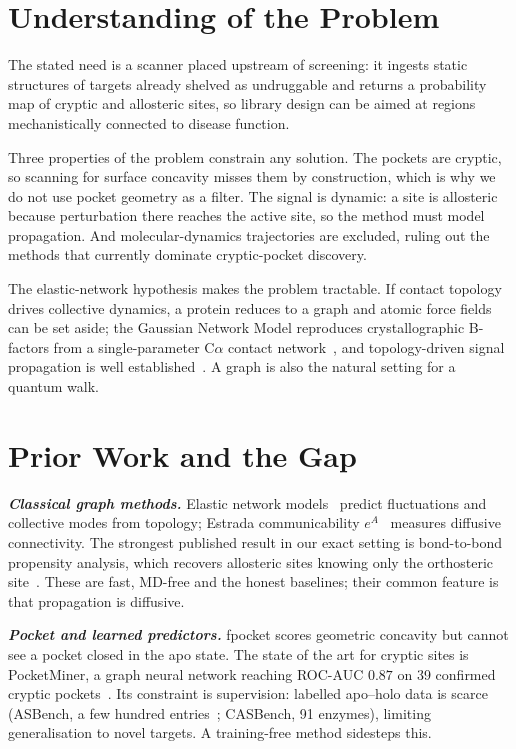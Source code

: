 \documentclass[10pt,a4paper]{article}
\newcommand{\lead}[1]{\textbf{\textit{#1}}}
\begin{document}
\section{Understanding of the Problem}

The stated need is a scanner placed upstream of screening: it ingests static structures of targets
already shelved as undruggable and returns a probability map of cryptic and allosteric sites, so
library design can be aimed at regions mechanistically connected to disease function.

Three properties of the problem constrain any solution. The pockets are cryptic, so scanning for
surface concavity misses them by construction, which is why we do not use pocket geometry as a
filter. The signal is dynamic: a site is allosteric because perturbation there reaches the active
site, so the method must model propagation. And molecular-dynamics trajectories are excluded, ruling
out the methods that currently dominate cryptic-pocket discovery.

The elastic-network hypothesis makes the problem tractable. If contact topology drives collective
dynamics, a protein reduces to a graph and atomic force fields can be set aside; the Gaussian Network
Model reproduces crystallographic B-factors from a single-parameter C$\alpha$ contact
network~\cite{bahar1997}, and topology-driven signal propagation is well
established~\cite{chennubhotla2007}. A graph is also the natural setting for a quantum walk.

\section{Prior Work and the Gap}

\lead{Classical graph methods.} Elastic network models~\cite{bahar1997,atilgan2001} predict
fluctuations and collective modes from topology; Estrada communicability
$e^{A}$~\cite{estrada2008} measures diffusive connectivity. The strongest published result in our
exact setting is bond-to-bond propensity analysis, which recovers allosteric sites knowing only the
orthosteric site~\cite{amor2016}. These are fast, MD-free and the honest baselines; their common
feature is that propagation is diffusive.

\lead{Pocket and learned predictors.} fpocket scores geometric concavity but cannot see a pocket
closed in the apo state. The state of the art for cryptic sites is PocketMiner, a graph neural
network reaching ROC-AUC $0.87$ on 39 confirmed cryptic pockets~\cite{meller2023}. Its constraint is
supervision: labelled apo--holo data is scarce (ASBench, a few hundred
entries~\cite{asbench2015}; CASBench, 91 enzymes), limiting generalisation to
novel targets. A training-free method sidesteps this.
\end{document}
